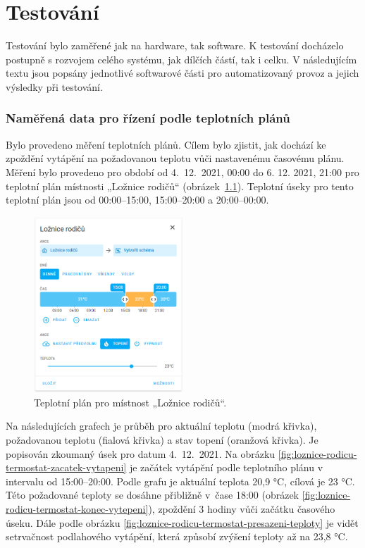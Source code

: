 \chapter{Testování}

Testování bylo zaměřené jak na hardware, tak software. K testování docházelo postupně s rozvojem celého systému, jak dílčích částí, tak i celku. V následujícím textu jsou popsány jednotlivé softwarové části pro automatizovaný provoz a jejich výsledky při testování.

\subsection{Naměřená data pro řízení podle teplotních plánů}

Bylo provedeno měření teplotních plánů. Cílem bylo zjistit, jak dochází ke zpoždění vytápění na požadovanou teplotu vůči nastavenému časovému plánu. Měření bylo provedeno pro období od 4.~12.~2021, 00:00 do 6. 12. 2021, 21:00 pro teplotní plán místnosti „Ložnice rodičů“ (obrázek~\ref{fig:teplotni-plan-loznice-rodicu}). Teplotní úseky pro tento teplotní plán jsou od 00:00–15:00, 15:00–20:00 a 20:00–00:00.

\begin{figure}[H]
    \centering
    \includegraphics[width=0.5\textwidth]{images/testovani/teplotni-plany/teplotni-plan-loznice-rodicu.png}
    \caption{Teplotní plán pro místnost „Ložnice rodičů“.}
    \label{fig:teplotni-plan-loznice-rodicu}
\end{figure}

Na následujících grafech je průběh pro aktuální teplotu (modrá křivka), požadovanou teplotu (fialová křivka) a stav topení (oranžová křivka). Je popisován zkoumaný úsek pro datum 4.~12.~2021. Na obrázku \ref{fig:loznice-rodicu-termostat-zacatek-vytapeni} je začátek vytápění podle teplotního plánu v intervalu od 15:00–20:00. Podle grafu je aktuální teplota 20,9 °C, cílová je 23 °C. Této požadované teploty se dosáhne přibližně v~čase 18:00 (obrázek \ref{fig:loznice-rodicu-termostat-konec-vytepeni}), zpoždění 3 hodiny vůči začátku časového úseku. Dále podle obrázku \ref{fig:loznice-rodicu-termostat-presazeni-teploty} je vidět setrvačnost podlahového vytápění, která způsobí zvýšení teploty až na 23,8 °C.

